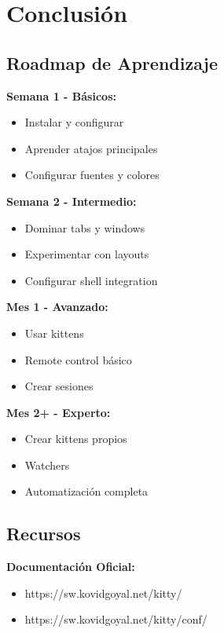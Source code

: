 \documentclass[
  doc,
  floatsintext,
  longtable,
  a4paper,
  nolmodern,
  notxfonts,
  notimes,
  12pt,
  colorlinks=true,linkcolor=blue,citecolor=blue,urlcolor=blue]{apa7}
\providecommand{\tightlist}{%
  \setlength{\itemsep}{0pt}\setlength{\parskip}{0pt}}
\begin{document}
\section{Conclusión}\label{conclusiuxf3n}

\subsection{Roadmap de Aprendizaje}\label{roadmap-de-aprendizaje}

\textbf{Semana 1 - Básicos:}

\begin{itemize}
\tightlist
\item
  Instalar y configurar
\item
  Aprender atajos principales
\item
  Configurar fuentes y colores
\end{itemize}

\textbf{Semana 2 - Intermedio:}

\begin{itemize}
\tightlist
\item
  Dominar tabs y windows
\item
  Experimentar con layouts
\item
  Configurar shell integration
\end{itemize}

\textbf{Mes 1 - Avanzado:}

\begin{itemize}
\tightlist
\item
  Usar kittens
\item
  Remote control básico
\item
  Crear sesiones
\end{itemize}

\textbf{Mes 2+ - Experto:}

\begin{itemize}
\tightlist
\item
  Crear kittens propios
\item
  Watchers
\item
  Automatización completa
\end{itemize}

\subsection{Recursos}\label{recursos}

\textbf{Documentación Oficial:}

\begin{itemize}
\tightlist
\item
  https://sw.kovidgoyal.net/kitty/
\item
  https://sw.kovidgoyal.net/kitty/conf/
\end{itemize}
\end{document}
